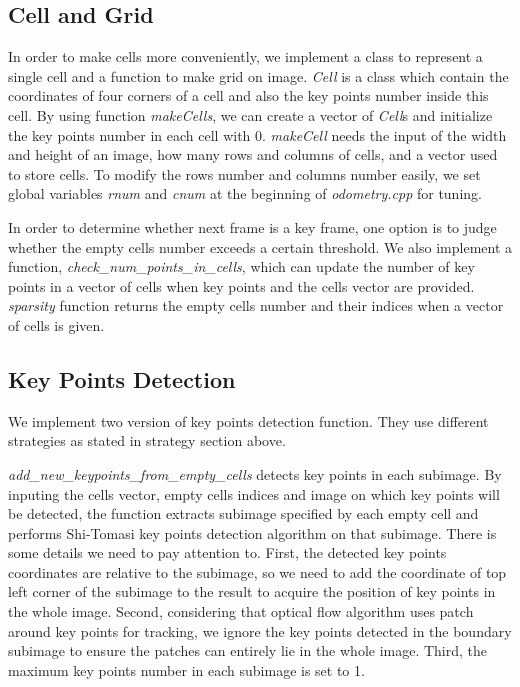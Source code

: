 \documentclass{easychair}
\begin{document}
\subsection{Cell and Grid}
In order to make cells more conveniently, we implement a class to represent a single cell and a function to make grid on image. \emph{Cell} is a class which contain the coordinates of four corners of a cell and also the key points number inside this cell. By using function \emph{makeCells}, we can create a vector of \emph{Cell}s and initialize the key points number in each cell with 0. \emph{makeCell} needs the input of the width and height of an image, how many rows and columns of cells, and a vector used to store cells. To modify the rows number and columns number easily, we set global variables \emph{rnum} and \emph{cnum} at the beginning of \emph{odometry.cpp} for tuning.

In order to determine whether next frame is a key frame, one option is to judge whether the empty cells number exceeds a certain threshold. We also implement a function, \emph{check\_num\_points\_in\_cells}, which can update the number of key points in a vector of cells when key points and the cells vector are provided.  \emph{sparsity} function returns the empty cells number and their indices when a vector of cells is given. 

\subsection{Key Points Detection}
We implement two version of key points detection function. They use different strategies as stated in strategy section above. 

\emph{add\_new\_keypoints\_from\_empty\_cells} detects key points in each subimage. By inputing the cells vector, empty cells indices and image on which key points will be detected, the function extracts subimage specified by each empty cell and performs Shi-Tomasi key points detection algorithm on that subimage. There is some details we need to pay attention to. First, the detected key points coordinates are relative to the subimage, so we need to add the coordinate of top left corner of the subimage to the result to acquire the position of key points in the whole image. Second, considering that optical flow algorithm uses patch around key points for tracking, we ignore the key points detected in the boundary subimage to ensure the patches can entirely lie in the whole image. Third, the maximum key points number in each subimage is set to 1.
\end{document}
